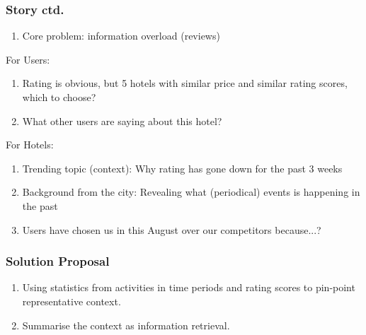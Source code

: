 \documentclass[xetex,mathserif,serif]{beamer}
\begin{document}
\begin{frame}
	\frametitle{Story ctd.}
\begin{enumerate}[*]
	\item Core problem: information overload (reviews)
\end{enumerate}
	For Users:
			\begin{enumerate}
			\item Rating is obvious, but 5 hotels with similar price and similar rating scores, which to choose?
			\item What other users are saying about this hotel?
		\end{enumerate}
	For Hotels:
		\begin{enumerate}
		\item Trending topic (context): Why rating has gone down for the past 3 weeks
		\item Background from the city: Revealing what (periodical) events is happening in the past
		\item Users have chosen us in this August over our competitors because...?
		
		
		\end{enumerate}
		

\end{frame}



\begin{frame}
	\frametitle{Solution Proposal}
	\begin{enumerate}
		\item Using statistics from activities in time periods and rating scores to pin-point representative context.
		\item Summarise the context as information retrieval.
	\end{enumerate}
	
	
\end{frame}
\end{document}

